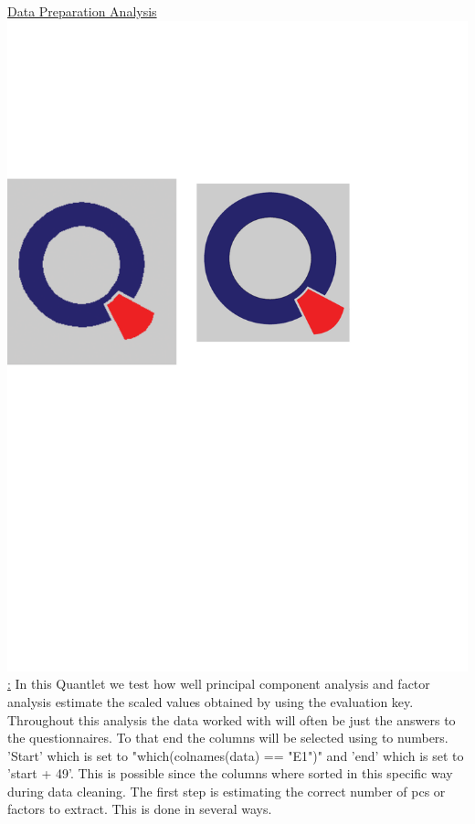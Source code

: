 \newline
\newline
\underline{Data Preparation Analysis \href{https://github.com/Matthias2193/SPL/blob/master/SPL_Big5DataPreparationAnalysis/SPL_Big5DataPreparationAnalysis.R}{\includegraphics[scale = 0.06]{Figures/qletlogo.pdf}} :} 
In this Quantlet we test how well principal component analysis and factor analysis estimate the scaled values obtained by using the evaluation key. Throughout this analysis the data worked with will often be just the answers to the questionnaires. To that end the columns will be selected using to numbers. 'Start' which is set to "which(colnames(data) == "E1")" and 'end' which is set to 'start + 49'. This is possible since the columns where sorted in this specific way during data cleaning.
\newline
The first step is estimating the correct number of pcs or factors to extract. This is done in several ways.
